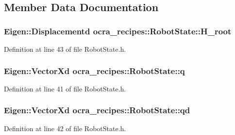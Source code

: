 \subsection{Member Data Documentation}
\subsubsection[{\texorpdfstring{H\+\_\+root}{H_root}}]{\setlength{\rightskip}{0pt plus 5cm}Eigen\+::\+Displacementd ocra\+\_\+recipes\+::\+Robot\+State\+::\+H\+\_\+root}\hypertarget{classocra__recipes_1_1RobotState_a296aaf0b3131a7d2c2a82b3b8a4cc583}{}\label{classocra__recipes_1_1RobotState_a296aaf0b3131a7d2c2a82b3b8a4cc583}


Definition at line 43 of file Robot\+State.\+h.

\subsubsection[{\texorpdfstring{q}{q}}]{\setlength{\rightskip}{0pt plus 5cm}Eigen\+::\+Vector\+Xd ocra\+\_\+recipes\+::\+Robot\+State\+::q}\hypertarget{classocra__recipes_1_1RobotState_aa442f30f43e33d4c5f5d007640d8aaa0}{}\label{classocra__recipes_1_1RobotState_aa442f30f43e33d4c5f5d007640d8aaa0}


Definition at line 41 of file Robot\+State.\+h.

\subsubsection[{\texorpdfstring{qd}{qd}}]{\setlength{\rightskip}{0pt plus 5cm}Eigen\+::\+Vector\+Xd ocra\+\_\+recipes\+::\+Robot\+State\+::qd}\hypertarget{classocra__recipes_1_1RobotState_ac45331562cde3f3f67a9f40d71e47c6a}{}\label{classocra__recipes_1_1RobotState_ac45331562cde3f3f67a9f40d71e47c6a}


Definition at line 42 of file Robot\+State.\+h.

